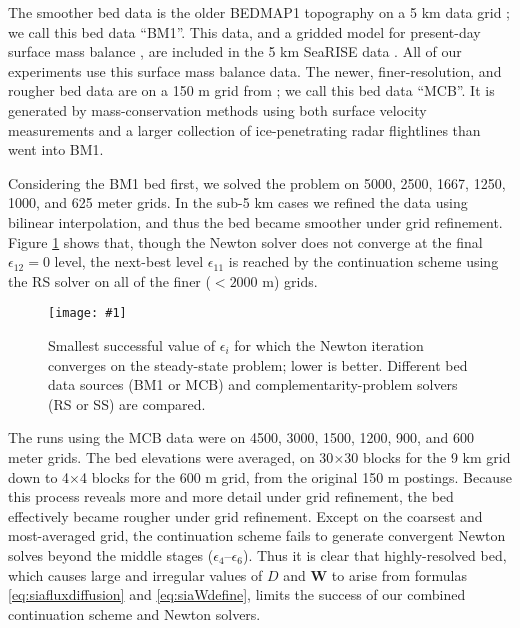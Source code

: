 \documentclass[twocolumn,a4paper]{igs}
\newcommand{\onecol}[1]{\texttt{[image: \#1]}}
\newcommand\bW{\mathbf{W}}
\newcommand\eps{\epsilon}
\begin{document}
\newcommand{\BM}{\textsf{BM1}\xspace}
\newcommand{\MCB}{\textsf{MCB}\xspace}
\newcommand{\virs}{\textsf{RS}\xspace}
\newcommand{\viss}{\textsf{SS}\xspace}

The smoother bed data is the older BEDMAP1 topography on a 5 km data grid \citep{Bamberetal2001}; we call this bed data ``\BM''.  This data, and a gridded model for present-day surface mass balance \citep{Ettemaetal2009}, are included in the 5 km SeaRISE data \citep{Bindschadleretal2013}.  All of our experiments use this surface mass balance data.  The newer, finer-resolution, and rougher bed data are on a 150 m grid from \cite{Morlighemetal2014}; we call this bed data ``\MCB''.  It is generated by mass-conservation methods using both surface velocity measurements and a larger collection of ice-penetrating radar flightlines than went into \BM.

Considering the \BM bed first, we solved the problem on 5000, 2500, 1667, 1250, 1000, and 625 meter grids.  In the sub-5 km cases we refined the data using bilinear interpolation, and thus the bed became smoother under grid refinement.  Figure \ref{fig:grnrobusteps} shows that, though the Newton solver does not converge at the final $\eps_{12}=0$ level, the next-best level $\eps_{11}$ is reached by the continuation scheme using the \virs solver on all of the finer ($<2000$ m) grids.

\begin{figure}[ht]
\onecol{grnrobusteps.pdf}
\caption{Smallest successful value of $\eps_i$ for which the Newton iteration converges on the steady-state problem; lower is better.  Different bed data sources (\BM or \MCB) and complementarity-problem solvers (\virs or \viss) are compared.}
\label{fig:grnrobusteps}
\end{figure}

The runs using the \MCB data were on 4500, 3000, 1500, 1200, 900, and 600 meter grids.  The bed elevations were averaged, on 30$\times$30 blocks for the 9 km grid down to 4$\times$4 blocks for the 600 m grid, from the original 150 m postings.  Because this process reveals more and more detail under grid refinement, the bed effectively became rougher under grid refinement.  Except on the coarsest and most-averaged grid, the continuation scheme fails to generate convergent Newton solves beyond the middle stages ($\eps_4$--$\eps_6$).  Thus it is clear that highly-resolved bed, which causes large and irregular values of $D$ and $\bW$ to arise from formulas \eqref{eq:siafluxdiffusion} and \eqref{eq:siaWdefine}, limits the success of our combined continuation scheme and Newton solvers.
\end{document}
